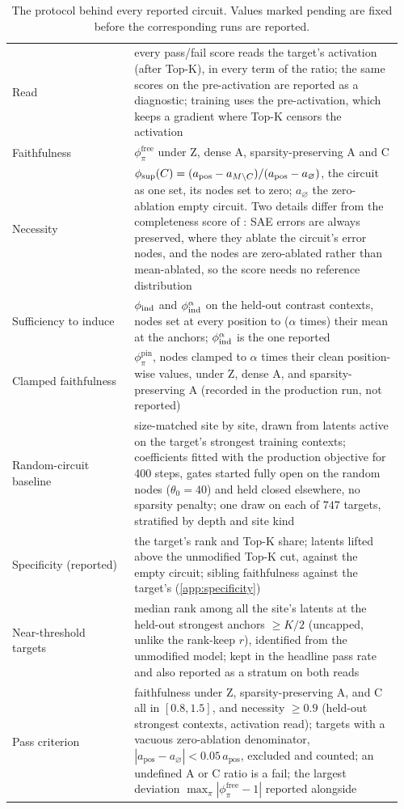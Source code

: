 \documentclass[10pt]{article}
\begin{document}
\begin{table}[h]
\begin{tabular}{@{}p{0.30\linewidth}p{0.66\linewidth}@{}}
Read & every pass/fail score reads the target's activation (after Top-K), in every term of the ratio; the same scores on the pre-activation are reported as a diagnostic; training uses the pre-activation, which keeps a gradient where Top-K censors the activation \\
Faithfulness & $\phi^{\mathrm{free}}_{\pi}$ under Z, dense A, sparsity-preserving A and C \\
Necessity & $\phi_{\mathrm{sup}}(C) = (a_{\mathrm{pos}} - a_{M \setminus C}) / (a_{\mathrm{pos}} - a_{\varnothing})$, the circuit as one set, its nodes set to zero; $a_{\varnothing}$ the zero-ablation empty circuit. Two details differ from the completeness score of \citet{marks2025sparse}: SAE errors are always preserved, where they ablate the circuit's error nodes, and the nodes are zero-ablated rather than mean-ablated, so the score needs no reference distribution \\
Sufficiency to induce & $\phi_{\mathrm{ind}}$ and $\phi_{\mathrm{ind}}^{\alpha}$ on the held-out contrast contexts, nodes set at every position to ($\alpha$ times) their mean at the anchors; $\phi_{\mathrm{ind}}^{\alpha}$ is the one reported \\
Clamped faithfulness & $\phi^{\mathrm{pin}}_{\pi}$, nodes clamped to $\alpha$ times their clean position-wise values, under Z, dense A, and sparsity-preserving A (recorded in the production run, not reported) \\
Random-circuit baseline & size-matched site by site, drawn from latents active on the target's strongest training contexts; coefficients fitted with the production objective for 400 steps, gates started fully open on the random nodes ($\theta_0 = 40$) and held closed elsewhere, no sparsity penalty; one draw on each of $747$ targets, stratified by depth and site kind \\
Specificity (reported) & the target's rank and Top-K share; latents lifted above the unmodified Top-K cut, against the empty circuit; sibling faithfulness against the target's (\cref{app:specificity}) \\
Near-threshold targets & median rank among all the site's latents at the held-out strongest anchors $\geq K/2$ (uncapped, unlike the rank-keep $r$), identified from the unmodified model; kept in the headline pass rate and also reported as a stratum on both reads \\
Pass criterion & faithfulness under Z, sparsity-preserving A, and C all in $[0.8, 1.5]$, and necessity $\geq 0.9$ (held-out strongest contexts, activation read); targets with a vacuous zero-ablation denominator, $|a_{\mathrm{pos}} - a_{\varnothing}| < 0.05\,a_{\mathrm{pos}}$, excluded and counted; an undefined A or C ratio is a fail; the largest deviation $\max_{\pi} |\phi^{\mathrm{free}}_{\pi} - 1|$ reported alongside \\
\bottomrule
\end{tabular}
\caption{The protocol behind every reported circuit. Values marked pending are fixed before the corresponding runs are reported.}
\label{tab:protocol}
\end{table}
\end{document}
